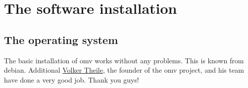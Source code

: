 

\section{The software installation}

\subsection{The operating system}

The basic installation of \gls{omv} works without any problems. This is known
from debian. Additional \href{https://www.openmediavault.org/?page_id=1206}{Volker Theile},
the founder of the \gls{omv} project, and his team have done a very good job.
Thank you guys!


